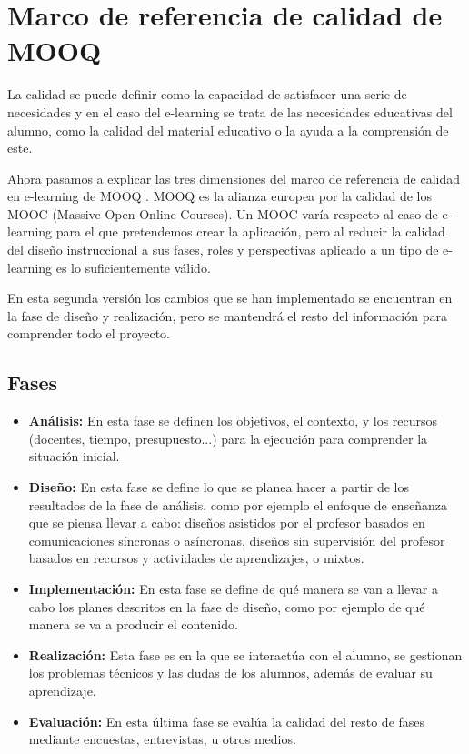 \section{Marco de referencia de calidad de MOOQ}
La calidad se puede definir como la capacidad de satisfacer una serie de necesidades y en el caso del e-learning se trata de las necesidades educativas del alumno, como la calidad del material educativo o la ayuda a la comprensión de este.

Ahora pasamos a explicar las tres dimensiones del marco de referencia de calidad en e-learning de MOOQ \cite{stracke2018quality}. MOOQ es la alianza europea por la calidad de los MOOC (Massive Open Online Courses). Un MOOC varía respecto al caso de e-learning para el que pretendemos crear la aplicación, pero al reducir la calidad del diseño instruccional a sus fases, roles y perspectivas aplicado a un tipo de e-learning es lo suficientemente válido.

En esta segunda versión los cambios que se han implementado se encuentran en la fase de diseño y realización, pero se mantendrá el resto del información para comprender todo el proyecto.

\subsection{Fases}
\begin{itemize}
	\item \textbf{Análisis:}
	En esta fase se definen los objetivos, el contexto, y los recursos (docentes, tiempo, presupuesto...) para la ejecución para comprender la situación inicial.
	\item \textbf{Diseño:}
	En esta fase se define lo que se planea hacer a partir de los resultados de la fase de análisis, como por ejemplo el enfoque de enseñanza que se piensa llevar a cabo: diseños asistidos por el profesor basados en comunicaciones síncronas o asíncronas, diseños sin supervisión del profesor basados en recursos y actividades de aprendizajes, o mixtos.
	\item \textbf{Implementación:}
	En esta fase se define de qué manera se van a llevar a cabo los planes descritos en la fase de diseño, como por ejemplo de qué manera se va a producir el contenido.
	\item \textbf{Realización:}
	Esta fase es en la que se interactúa con el alumno, se gestionan los problemas técnicos y las dudas de los alumnos, además de evaluar su aprendizaje.
	\item \textbf{Evaluación:}
	En esta última fase se evalúa la calidad del resto de fases mediante encuestas, entrevistas, u otros medios.
\end{itemize}

